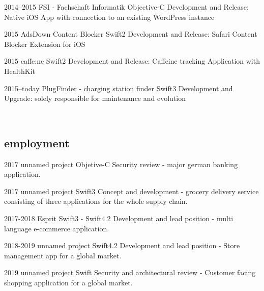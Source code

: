 \documentclass[]{friggeri-cv} %
\begin{document}
\begin{entrylist}


\entry
{2014--2015}
{FSI - Fachschaft Informatik}
{Objective-C}
{Development and Release: Native iOS App with connection to an existing WordPress instance}


\entry
{2015}
{AdsDown Content Blocker}
{Swift2}
{Development and Release: Safari Content Blocker Extension for iOS}


\entry
{2015}
{caffe:ne}
{Swift2}
{Development and Release: Caffeine tracking Application with HealthKit}


\entry
{2015--today}
{PlugFinder - charging station finder}
{Swift3}
{Development and Upgrade: solely responsible for maintenance and evolution}

\\
\end{entrylist}

\subsection{employment}

\begin{entrylist}
	
	
\entry
{2017}
{unnamed project}
{Objetive-C}
{Security review - major german banking application.}
	
	
\entry
{2017}
{unnamed project}
{Swift3}
{Concept and development - grocery delivery service consisting of three applications for the whole supply chain.}
	
	
\entry
{2017-2018}
{Esprit}
{Swift3 - Swift4.2}
{Development and lead position - multi language e-commerce application.}
	

\entry
{2018-2019}
{unnamed project}
{Swift4.2}
{Development and lead position - Store management app for a global market.}


\entry
{2019}
{unnamed project}
{Swift}
{Security and architectural review - Customer facing shopping application for a global market.}



\\
\end{entrylist}
\end{document}
